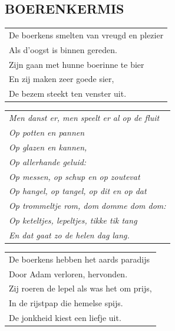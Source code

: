 \documentclass[a4paper, 14pt]{extarticle}
\begin{document}
\subsection*{BOERENKERMIS}
\begin{flushleft}
\begin{tabularx}{0.8\textwidth} {
   >{\raggedright\arraybackslash}X}
   De boerkens smelten van vreugd en plezier\\
Als d’oogst is binnen gereden.\\
Zijn gaan met hunne boerinne te bier\\
En zij maken zeer goede sier,\\
De bezem steekt ten venster uit.\\
\end{tabularx}
\end{flushleft}\begin{flushleft}
\begin{tabularx}{0.8\textwidth} {
   >{\raggedright\arraybackslash}X}
\textit{Men danst er, men speelt er al op de fluit}\\
\textit{Op potten en pannen}\\
\textit{Op glazen en kannen,}\\
\textit{Op allerhande geluid:}\\
\textit{Op messen, op schup en op zoutevat}\\
\textit{Op hangel, op tangel, op dit en op dat}\\
\textit{Op trommeltje rom, dom domme dom dom:}\\
\textit{Op keteltjes, lepeltjes, tikke tik tang}\\
\textit{En dat gaat zo de helen dag lang.}\\
\end{tabularx}
\end{flushleft}\begin{flushleft}
\begin{tabularx}{0.8\textwidth} {
   >{\raggedright\arraybackslash}X}
De boerkens hebben het aards paradijs\\
Door Adam verloren, hervonden.\\
Zij roeren de lepel als was het om prijs,\\
In de rijstpap die hemelse spijs.\\
De jonkheid kiest een liefje uit.\\
\end{tabularx}
\end{flushleft}
\end{document}
